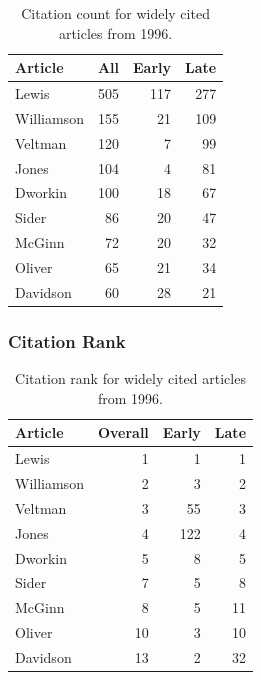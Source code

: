 \documentclass[
  10pt,
  letterpaper,
  DIV=11,
  numbers=noendperiod,
  twoside]{scrartcl}
\begin{document}
\begin{longtable}[]{@{}lrrr@{}}

\caption{\label{tbl-citation-count-1996}Citation count for widely cited
articles from 1996.}

\tabularnewline

\toprule\noalign{}
Article & All & Early & Late \\
\midrule\noalign{}
\endhead
\bottomrule\noalign{}
\endlastfoot
Lewis & 505 & 117 & 277 \\
Williamson & 155 & 21 & 109 \\
Veltman & 120 & 7 & 99 \\
Jones & 104 & 4 & 81 \\
Dworkin & 100 & 18 & 67 \\
Sider & 86 & 20 & 47 \\
McGinn & 72 & 20 & 32 \\
Oliver & 65 & 21 & 34 \\
Davidson & 60 & 28 & 21 \\

\end{longtable}

\subsubsection*{Citation Rank}\label{citation-rank-20}

\begin{longtable}[]{@{}lrrr@{}}

\caption{\label{tbl-citation-rank-1996}Citation rank for widely cited
articles from 1996.}

\tabularnewline

\toprule\noalign{}
Article & Overall & Early & Late \\
\midrule\noalign{}
\endhead
\bottomrule\noalign{}
\endlastfoot
Lewis & 1 & 1 & 1 \\
Williamson & 2 & 3 & 2 \\
Veltman & 3 & 55 & 3 \\
Jones & 4 & 122 & 4 \\
Dworkin & 5 & 8 & 5 \\
Sider & 7 & 5 & 8 \\
McGinn & 8 & 5 & 11 \\
Oliver & 10 & 3 & 10 \\
Davidson & 13 & 2 & 32 \\

\end{longtable}
\end{document}
